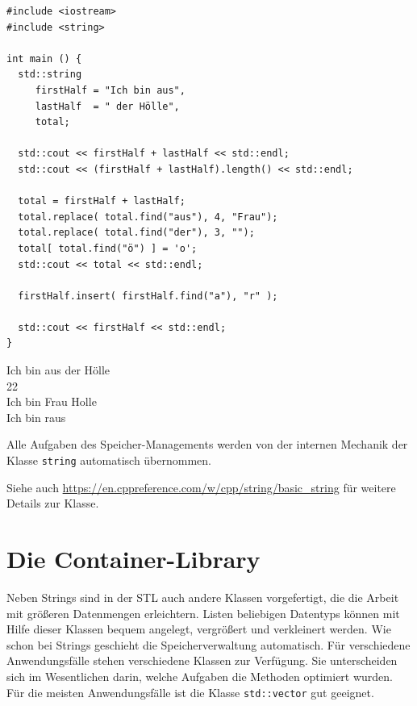 \begin{codebox}
\begin{verbatim}
#include <iostream>
#include <string>

int main () {
  std::string 
     firstHalf = "Ich bin aus", 
     lastHalf  = " der Hölle",
     total;
  
  std::cout << firstHalf + lastHalf << std::endl;
  std::cout << (firstHalf + lastHalf).length() << std::endl;
  
  total = firstHalf + lastHalf;
  total.replace( total.find("aus"), 4, "Frau");
  total.replace( total.find("der"), 3, "");
  total[ total.find("ö") ] = 'o';
  std::cout << total << std::endl;
  
  firstHalf.insert( firstHalf.find("a"), "r" );
  
  std::cout << firstHalf << std::endl;
}
\end{verbatim}
\end{codebox}

\begin{cmdbox}
Ich bin aus der Hölle \\
22\\
Ich bin Frau Holle\\
Ich bin raus
\end{cmdbox}

Alle Aufgaben des Speicher-Managements werden von der internen Mechanik der Klasse \texttt{string} automatisch übernommen.

Siehe auch \url{https://en.cppreference.com/w/cpp/string/basic_string} für weitere Details zur Klasse.


\section{Die Container-Library}
Neben Strings sind in der STL auch andere Klassen vorgefertigt, die die Arbeit mit größeren Datenmengen erleichtern. Listen beliebigen Datentyps können mit Hilfe dieser Klassen bequem angelegt, vergrößert und verkleinert werden. Wie schon bei Strings geschieht die Speicherverwaltung automatisch. Für verschiedene Anwendungsfälle stehen verschiedene Klassen zur Verfügung. Sie unterscheiden sich im Wesentlichen darin, welche Aufgaben die Methoden optimiert wurden. Für die meisten Anwendungsfälle ist die Klasse \texttt{std::vector} gut geeignet.

